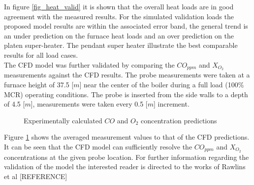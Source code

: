 \documentclass[review]{elsarticle}
\begin{document}
In figure \ref{fig_heat_valid} it is shown that the overall heat loads are in good agreement with the measured results. For the simulated validation loads the proposed model results are within the associated error band, the general trend is an under prediction on the furnace heat loads and an over prediction on the platen super-heater. The pendant super heater illustrate the best comparable results for all load cases.\\

The CFD model was further validated by comparing the $CO_{ppm}$ and $X_{O_{2}}$ measurements against the CFD results. The probe measurements were taken at a furnace height of 37.5 [$m$] near the center of the boiler during a full load (100\% MCR) operating conditions. The probe is inserted from the side walls to a depth of 4.5 [$m$], measurements were taken every 0.5 [$m$] increment.\\
\begin{figure}[h!]
\centering
{}
\hspace{5mm}
\caption{Experimentally calculated $CO$ and $O_2$ concentration predictions}
\label{fig_probe_valid}
\end{figure}

Figure \ref{fig_probe_valid} shows the averaged measurement values to that of the CFD predictions. It can be seen that the CFD model can sufficiently resolve the $CO_{ppm}$ and $X_{O_{2}}$ concentrations at the given probe location. For further information regarding the validation of the model the interested reader is directed to the works of Rawlins et al [REFERENCE]
\end{document}

